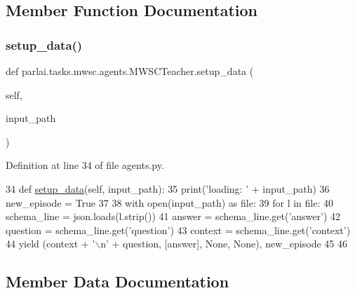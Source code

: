 \subsection{Member Function Documentation}
\mbox{\label{classparlai_1_1tasks_1_1mwsc_1_1agents_1_1MWSCTeacher_a4322a44f14e996732885b5cecd16b9ed}} 
\subsubsection{\texorpdfstring{setup\+\_\+data()}{setup\_data()}}
{\footnotesize\ttfamily def parlai.\+tasks.\+mwsc.\+agents.\+M\+W\+S\+C\+Teacher.\+setup\+\_\+data (\begin{DoxyParamCaption}\item[{}]{self,  }\item[{}]{input\+\_\+path }\end{DoxyParamCaption})}



Definition at line 34 of file agents.\+py.


\begin{DoxyCode}
34     \textcolor{keyword}{def }\hyperlink{namespaceparlai_1_1tasks_1_1multinli_1_1agents_a4fa2cb0ba1ed745336ad8bceed36b841}{setup\_data}(self, input\_path):
35         print(\textcolor{stringliteral}{'loading: '} + input\_path)
36         new\_episode = \textcolor{keyword}{True}
37 
38         with open(input\_path) \textcolor{keyword}{as} file:
39             \textcolor{keywordflow}{for} l \textcolor{keywordflow}{in} file:
40                 schema\_line = json.loads(l.strip())
41                 answer = schema\_line.get(\textcolor{stringliteral}{'answer'})
42                 question = schema\_line.get(\textcolor{stringliteral}{'question'})
43                 context = schema\_line.get(\textcolor{stringliteral}{'context'})
44                 \textcolor{keywordflow}{yield} (context + \textcolor{stringliteral}{'\(\backslash\)n'} + question, [answer], \textcolor{keywordtype}{None}, \textcolor{keywordtype}{None}), new\_episode
45 
46 
\end{DoxyCode}


\subsection{Member Data Documentation}
\mbox{\label{classparlai_1_1tasks_1_1mwsc_1_1agents_1_1MWSCTeacher_adf6ee7cc6353af323324751874b42a74}} 
